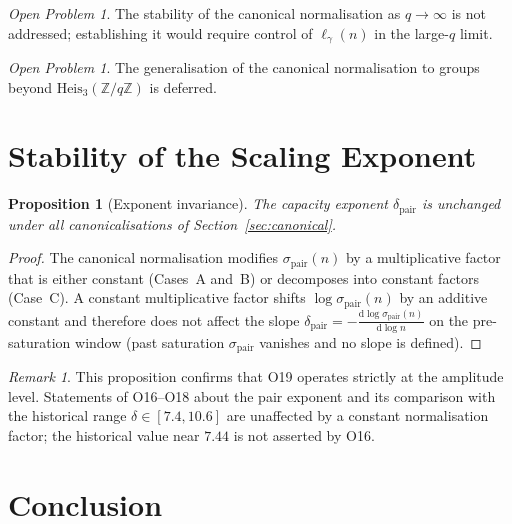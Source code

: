 \documentclass[11pt,a4paper]{article}
\newtheorem{proposition}[theorem]{Proposition}
\theoremstyle{remark}
\newtheorem{remark}[theorem]{Remark}
\newtheorem{openproblem}[theorem]{Open Problem}
\newcommand{\dpair}{\delta_{\mathrm{pair}}}
\newcommand{\sigmapair}{\sigma_{\mathrm{pair}}}
\newcommand{\Heis}{\mathrm{Heis}_{3}(\mathbb{Z}/q\mathbb{Z})}
\newcommand{\ellgam}{\ell_{\gamma}}
\begin{document}
    \begin{openproblem}
      \label{op:general-q}
      The stability of the canonical normalisation as $q \to \infty$ is not
      addressed; establishing it would require control of $\ellgam(n)$ in the
      large-$q$ limit.
    \end{openproblem}

    \begin{openproblem}
      \label{op:beyond-heis}
      The generalisation of the canonical normalisation to groups beyond
      $\Heis$ is deferred.
    \end{openproblem}

  \section{Stability of the Scaling Exponent}
  \label{sec:stability}


  \begin{proposition}[Exponent invariance]
    \label{prop:exponent}
    The capacity exponent $\dpair$ is unchanged under all canonicalisations of
    Section~\ref{sec:canonical}.
  \end{proposition}

  \begin{proof}
    The canonical normalisation modifies $\sigmapair(n)$ by a multiplicative
    factor that is either constant (Cases~A and~B) or decomposes into constant
    factors (Case~C).
    A constant multiplicative factor shifts $\log \sigmapair(n)$ by an additive
    constant and therefore does not affect the slope
    $\dpair = -\frac{\mathrm{d}\log\sigmapair(n)}{\mathrm{d}\log n}$ on the pre-saturation window
    (past saturation $\sigmapair$ vanishes and no slope is defined).
  \end{proof}

  \begin{remark}
    This proposition confirms that O19 operates strictly at the amplitude level.
    Statements of O16--O18 about the pair exponent and its comparison with the historical range
    $\delta \in [7.4, 10.6]$ are unaffected by a constant normalisation factor; the historical
    value near $7.44$ is not asserted by O16.
  \end{remark}

  \section{Conclusion}
  \label{sec:conclusion}
\end{document}
